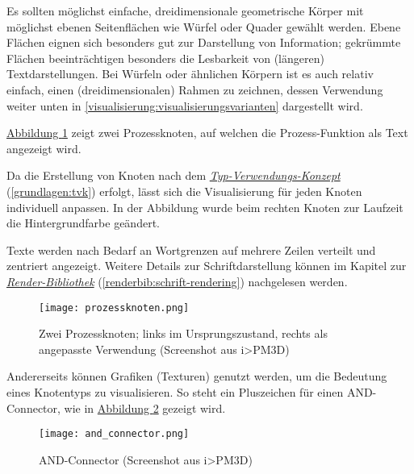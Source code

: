 \documentclass[a4paper,10pt]{sphinxmanual}
\begin{document}
Es sollten möglichst einfache, dreidimensionale geometrische Körper mit möglichst ebenen Seitenflächen wie Würfel oder Quader gewählt werden.
Ebene Flächen eignen sich besonders gut zur Darstellung von Information; gekrümmte Flächen beeinträchtigen besonders die Lesbarkeit von (längeren) Textdarstellungen.
Bei Würfeln oder ähnlichen Körpern ist es auch relativ einfach, einen (dreidimensionalen) Rahmen zu zeichnen, dessen Verwendung weiter unten in \autoref*{visualisierung:visualisierungsvarianten} dargestellt wird.

\hyperref[visualisierung:prozessknoten]{Abbildung  \ref*{visualisierung:prozessknoten}} zeigt zwei Prozessknoten, auf welchen die Prozess-Funktion als Text angezeigt wird.

Da die Erstellung von Knoten nach dem {\hyperref[grundlagen:tvk]{\emph{Typ-Verwendungs-Konzept}}} (\autoref*{grundlagen:tvk}) erfolgt, lässt sich die Visualisierung für jeden Knoten individuell anpassen.
In der Abbildung wurde beim rechten Knoten zur Laufzeit die Hintergrundfarbe geändert.

Texte werden nach Bedarf an Wortgrenzen auf mehrere Zeilen verteilt und zentriert angezeigt.
Weitere Details zur Schriftdarstellung können im Kapitel zur {\hyperref[renderbib:schrift-rendering]{\emph{Render-Bibliothek}}} (\autoref*{renderbib:schrift-rendering}) nachgelesen werden.
\begin{figure}[htbp]
\centering
\capstart

\texttt{[image: prozessknoten.png]}
\caption{Zwei Prozessknoten; links im Ursprungszustand, rechts als angepasste Verwendung (Screenshot aus i\textgreater{}PM3D)}\label{visualisierung:prozessknoten}\end{figure}

Andererseits können Grafiken (Texturen) genutzt werden, um die Bedeutung eines Knotentyps zu visualisieren.
So steht ein Pluszeichen für einen AND-Connector, wie in \hyperref[visualisierung:and-connector]{Abbildung  \ref*{visualisierung:and-connector}} gezeigt wird.
\begin{figure}[htbp]
\centering
\capstart

\texttt{[image: and\_connector.png]}
\caption{AND-Connector (Screenshot aus i\textgreater{}PM3D)}\label{visualisierung:and-connector}\end{figure}
\end{document}
